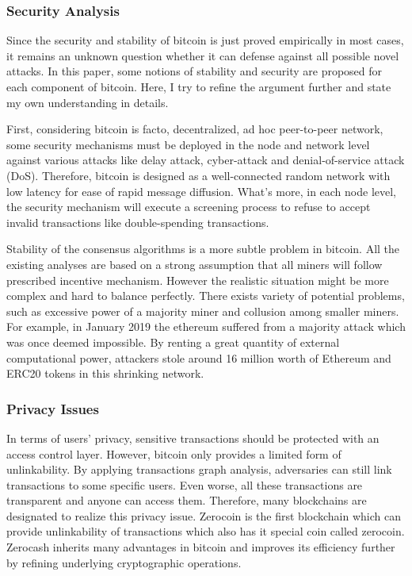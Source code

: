 \documentclass[conference]{IEEEtran}
\begin{document}
\subsubsection{Security Analysis}
Since the security and stability of bitcoin is just proved empirically in most cases, it remains an unknown question whether it can defense against all possible novel attacks.
%
In this paper, some notions of stability and security are proposed for each component of bitcoin. Here, I try to refine the argument further and state my own understanding in details.

First, considering bitcoin is facto, decentralized, ad hoc peer-to-peer network, some security mechanisms must be deployed in the node and network level against various attacks like delay attack, cyber-attack and denial-of-service attack (DoS).
%
Therefore, bitcoin is designed as a well-connected random network with low latency for ease of rapid message diffusion. 
%
What's more, in each node level, the security mechanism will execute a screening process to refuse to accept invalid transactions like double-spending transactions.

Stability of the consensus algorithms is a more subtle problem in bitcoin.
%
All the existing analyses are based on a strong assumption that all miners will follow prescribed incentive mechanism.
%
However the realistic situation might be more complex and hard to balance perfectly.
%
There exists variety of potential problems, such as excessive power of a majority miner and collusion among smaller miners.
%
For example, in January 2019 the ethereum\cite{wood2014ethereum} suffered from a majority attack which was once deemed impossible.
%
By renting a great quantity of external computational power, attackers stole around 16 million worth of Ethereum and ERC20 tokens in this shrinking network.

\subsubsection{Privacy Issues}
In terms of users' privacy, sensitive transactions should be protected with an access control layer. 
%
However, bitcoin only provides a limited form of unlinkability.
%
By applying transactions graph analysis, adversaries can still link transactions to some specific users.
%
Even worse, all these transactions are transparent and anyone can access them.
%
Therefore, many blockchains are designated to realize this privacy issue. 
%
Zerocoin\cite{miers2013zerocoin} is the first blockchain which can provide unlinkability of transactions which also has it special coin called zerocoin.
%
Zerocash\cite{sasson2014zerocash} inherits many advantages in bitcoin and improves its efficiency further by refining underlying cryptographic operations.
\end{document}
